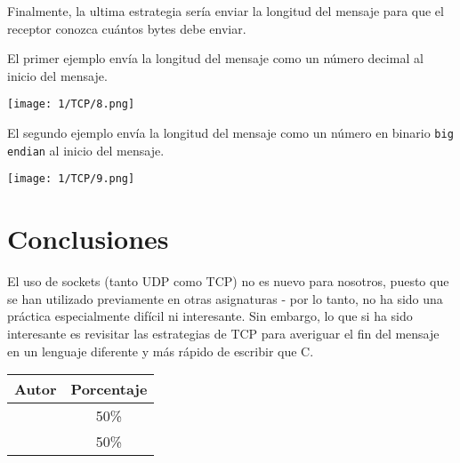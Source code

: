 Finalmente, la ultima estrategia sería enviar la longitud del mensaje
para que el receptor conozca cuántos bytes debe enviar.

El primer ejemplo envía la longitud del mensaje como un número decimal
al inicio del mensaje.

\begin{minipage}{\linewidth}
	\centering
	\texttt{[image: 1/TCP/8.png]}
	\label{fig:1/10}
\end{minipage}

El segundo ejemplo envía la longitud del mensaje como un número en binario
\verb#big endian# al inicio del mensaje.

\begin{minipage}{\linewidth}
	\centering
	\texttt{[image: 1/TCP/9.png]}
	\label{fig:1/11}
\end{minipage}

\section{Conclusiones}

El uso de sockets (tanto UDP como TCP) no es nuevo para nosotros, puesto que se han
utilizado previamente en otras asignaturas{ - }por lo tanto, no ha sido una práctica
especialmente difícil ni interesante. Sin embargo, lo que si ha sido interesante es
revisitar las estrategias de TCP para averiguar el fin del mensaje en un lenguaje
diferente y más rápido de escribir que C.

\begin{center}
	\begin{tabular}{|c|c|}
		\hline
		\textbf{Autor} & \textbf{Porcentaje} \\
		\hline
		\hline
		\authorOne & 50\% \\
		\authorTwo & 50\% \\
		\hline
	\end{tabular}
\end{center}
